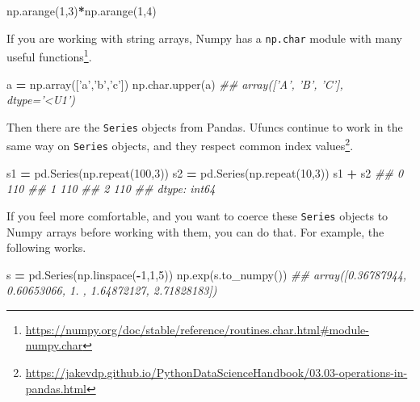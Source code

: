 \documentclass[12pt,krantz2]{krantz}
\makeatletter
\newenvironment{Shaded}{\begin{snugshade}}{\end{snugshade}}
\newcommand{\CommentTok}[1]{\textcolor[rgb]{0.37,0.37,0.37}{\textit{#1}}}
\newcommand{\DecValTok}[1]{\textcolor[rgb]{0.06,0.06,0.06}{#1}}
\newcommand{\NormalTok}[1]{#1}
\newcommand{\OperatorTok}[1]{\textcolor[rgb]{0.43,0.43,0.43}{\textbf{#1}}}
\newcommand{\StringTok}[1]{\textcolor[rgb]{0.5,0.5,0.5}{#1}}
\renewcommand{\href}[2]{#2\footnote{\url{#1}}}
\newenvironment{kframe}{%
\medskip{}
\setlength{\fboxsep}{.8em}
 \def\at@end@of@kframe{}%
 \ifinner\ifhmode%
  \def\at@end@of@kframe{\end{minipage}}%
  \begin{minipage}{\columnwidth}%
 \fi\fi%
 \def\FrameCommand##1{\hskip\@totalleftmargin \hskip-\fboxsep
 \colorbox{shadecolor}{##1}\hskip-\fboxsep
     \hskip-\linewidth \hskip-\@totalleftmargin \hskip\columnwidth}%
 \MakeFramed {\advance\hsize-\width
   \@totalleftmargin\z@ \linewidth\hsize
   \@setminipage}}%
 {\par\unskip\endMakeFramed%
 \at@end@of@kframe}
\renewenvironment{Shaded}{\begin{kframe}}{\end{kframe}}
\makeatother
\begin{document}
\begin{Shaded}
\begin{Highlighting}[]
\NormalTok{np.arange(}\DecValTok{1}\NormalTok{,}\DecValTok{3}\NormalTok{)}\OperatorTok{*}\NormalTok{np.arange(}\DecValTok{1}\NormalTok{,}\DecValTok{4}\NormalTok{)}
\end{Highlighting}
\end{Shaded}

If you are working with string arrays, Numpy has a \href{https://numpy.org/doc/stable/reference/routines.char.html\#module-numpy.char}{\texttt{np.char} module with many useful functions}.

\begin{Shaded}
\begin{Highlighting}[]
\NormalTok{a }\OperatorTok{=}\NormalTok{ np.array([}\StringTok{'a'}\NormalTok{,}\StringTok{'b'}\NormalTok{,}\StringTok{'c'}\NormalTok{])}
\NormalTok{np.char.upper(a)}
\CommentTok{## array(['A', 'B', 'C'], dtype='<U1')}
\end{Highlighting}
\end{Shaded}

Then there are the \texttt{Series} objects from Pandas. Ufuncs continue to work in the same way on \texttt{Series} objects, and they \href{https://jakevdp.github.io/PythonDataScienceHandbook/03.03-operations-in-pandas.html}{respect common index values}.

\begin{Shaded}
\begin{Highlighting}[]
\NormalTok{s1 }\OperatorTok{=}\NormalTok{ pd.Series(np.repeat(}\DecValTok{100}\NormalTok{,}\DecValTok{3}\NormalTok{))}
\NormalTok{s2 }\OperatorTok{=}\NormalTok{ pd.Series(np.repeat(}\DecValTok{10}\NormalTok{,}\DecValTok{3}\NormalTok{))}
\NormalTok{s1 }\OperatorTok{+}\NormalTok{ s2}
\CommentTok{## 0    110}
\CommentTok{## 1    110}
\CommentTok{## 2    110}
\CommentTok{## dtype: int64}
\end{Highlighting}
\end{Shaded}

If you feel more comfortable, and you want to coerce these \texttt{Series} objects to Numpy arrays before working with them, you can do that. For example, the following works.

\begin{Shaded}
\begin{Highlighting}[]
\NormalTok{s }\OperatorTok{=}\NormalTok{ pd.Series(np.linspace(}\OperatorTok{-}\DecValTok{1}\NormalTok{,}\DecValTok{1}\NormalTok{,}\DecValTok{5}\NormalTok{))}
\NormalTok{np.exp(s.to_numpy())}
\CommentTok{## array([0.36787944, 0.60653066, 1.        , 1.64872127, 2.71828183])}
\end{Highlighting}
\end{Shaded}
\end{document}
